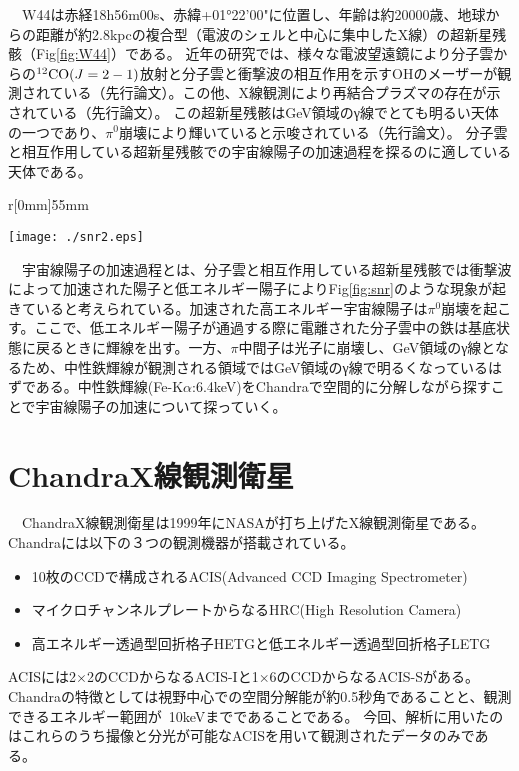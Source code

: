 \documentclass[10pt]{article}
\begin{document}
~~W44は赤経18h56m00s、赤緯+01°22'00"に位置し、年齢は約20000歳、地球からの距離が約2.8kpcの複合型（電波のシェルと中心に集中したX線）の超新星残骸（Fig\ref{fig:W44}）である。
近年の研究では、様々な電波望遠鏡により分子雲からの$^{12}{\rm CO}(J=2-1)$放射と分子雲と衝撃波の相互作用を示すOHのメーザーが観測されている（先行論文\cite{sato}）。この他、X線観測により再結合プラズマの存在が示されている（先行論文\cite{uchida}）。
この超新星残骸はGeV領域のγ線でとても明るい天体の一つであり、$\pi^0$崩壊により輝いていると示唆されている（先行論文\cite{sato}）。
分子雲と相互作用している超新星残骸での宇宙線陽子の加速過程を探るのに適している天体である。
\begin{wrapfigure}[10]{r}[0mm]{55mm}
\begin{center}
\texttt{[image: ./snr2.eps]}
\caption{宇宙線陽子の加速機構（先行論文\cite{sato}）}
\label{fig:snr}
 \end{center}
\end{wrapfigure}
~~宇宙線陽子の加速過程とは、分子雲と相互作用している超新星残骸では衝撃波によって加速された陽子と低エネルギー陽子によりFig\ref{fig:snr}のような現象が起きていると考えられている。加速された高エネルギー宇宙線陽子は$\pi^0$崩壊を起こす。ここで、低エネルギー陽子が通過する際に電離された分子雲中の鉄は基底状態に戻るときに輝線を出す。一方、$\pi$中間子は光子に崩壊し、GeV領域のγ線となるため、中性鉄輝線が観測される領域ではGeV領域のγ線で明るくなっているはずである。中性鉄輝線(Fe-K$\alpha$:6.4keV)をChandraで空間的に分解しながら探すことで宇宙線陽子の加速について探っていく。\\
\section{{\normalsize ChandraX線観測衛星}}
~~ChandraX線観測衛星は1999年にNASAが打ち上げたX線観測衛星である。Chandraには以下の３つの観測機器が搭載されている。
 \begin{itemize}
 \item 10枚のCCDで構成されるACIS(Advanced CCD Imaging Spectrometer)
 \item マイクロチャンネルプレートからなるHRC(High Resolution Camera)
 \item 高エネルギー透過型回折格子HETGと低エネルギー透過型回折格子LETG
\end{itemize}
ACISには2$\times$2のCCDからなるACIS-Iと1$\times$6のCCDからなるACIS-Sがある。Chandraの特徴としては視野中心での空間分解能が約0.5秒角であることと、観測できるエネルギー範囲が~10keVまでであることである。
今回、解析に用いたのはこれらのうち撮像と分光が可能なACISを用いて観測されたデータのみである。
\end{document}
